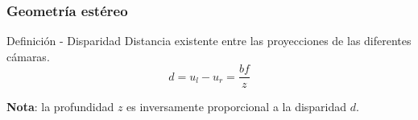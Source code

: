 \begin{frame}
	\frametitle{Geometría estéreo}

	\begin{block}{Definición - Disparidad}
		Distancia existente entre las proyecciones de las diferentes cámaras.
	\begin{equation}
		d=u_{l}-u_{r}=\frac{bf}{z}
	\end{equation}
	\end{block}

	\textbf{Nota}: la profundidad $z$ es inversamente proporcional a la disparidad $d$.

	\vspace{-1em}
	\begin{figure}[!htb]
		\centering
		\hfill
		\centering
		\hfill
	\end{figure}

\end{frame}



